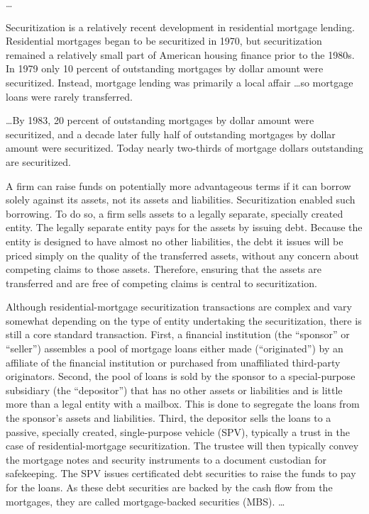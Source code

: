 
\ldots


Securitization is a relatively recent development in residential mortgage
lending. Residential mortgages began to be securitized in 1970, but
securitization remained a relatively small part of American housing finance
prior to the 1980s. In 1979 only 10 percent of outstanding mortgages by dollar
amount were securitized. Instead, mortgage lending was primarily a local
affair \dots so mortgage loans were rarely transferred.

\dots By 1983, 20 percent of outstanding mortgages by dollar amount were
securitized, and a decade later fully half of outstanding mortgages by dollar
amount were securitized. Today nearly two-thirds of mortgage dollars
outstanding are securitized.

A firm can raise funds on potentially more advantageous terms if it can borrow
solely against its assets, not its assets and liabilities. Securitization
enabled such borrowing. To do so, a firm sells assets to a legally separate,
specially created entity. The legally separate entity pays for the assets by
issuing debt. Because the entity is designed to have almost no other
liabilities, the debt it issues will be priced simply on the quality of the
transferred assets, without any concern about competing claims to those assets.
Therefore, ensuring that the assets are transferred and are free of competing
claims is central to securitization.

Although residential-mortgage securitization transactions are complex and vary
somewhat depending on the type of entity undertaking the securitization, there
is still a  core standard  transaction. First, a financial  institution  (the
``sponsor''  or ``seller'') assembles a pool of mortgage loans either made
(``originated'')  by  an affiliate of the financial institution or
purchased from unaffiliated third-party originators. Second, the pool of
loans is sold by the sponsor to a special-purpose subsidiary (the
``depositor'') that has no other assets or liabilities and is little more than
a legal entity with a mailbox. This is done to segregate the loans from the
sponsor's assets and liabilities. Third, the depositor sells the loans to a
passive, specially created, single-purpose vehicle (SPV), typically a trust in
the case of residential-mortgage securitization. The trustee will then
typically convey the mortgage notes and security instruments to a document
custodian for safekeeping. The SPV issues certificated debt securities to raise
the funds to pay for the loans. As these debt securities are backed by the cash
flow from the mortgages, they are called mortgage-backed securities (MBS).
\dots

